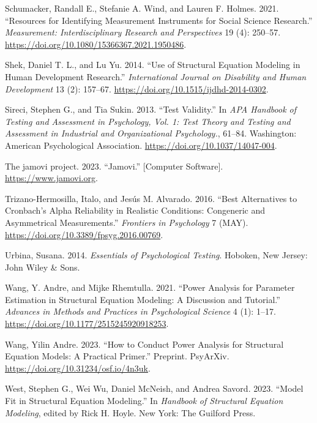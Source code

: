 \documentclass[
  a4paper,
]{article}
\newlength{\cslhangindent}
\newenvironment{CSLReferences}[2] %
 {\begin{list}{}{%
  \setlength{\itemindent}{0pt}
  \setlength{\leftmargin}{0pt}
  \setlength{\parsep}{0pt}
  \ifodd #1
   \setlength{\leftmargin}{\cslhangindent}
   \setlength{\itemindent}{-1\cslhangindent}
  \fi
  \setlength{\itemsep}{#2\baselineskip}}}
 {\end{list}}
\begin{document}
\begin{CSLReferences}{1}{0}
Schumacker, Randall E., Stefanie A. Wind, and Lauren F. Holmes. 2021.
{``Resources for {Identifying Measurement Instruments} for {Social
Science Research}.''} \emph{Measurement: Interdisciplinary Research and
Perspectives} 19 (4): 250--57.
\url{https://doi.org/10.1080/15366367.2021.1950486}.

Shek, Daniel T. L., and Lu Yu. 2014. {``Use of Structural Equation
Modeling in Human Development Research.''} \emph{International Journal
on Disability and Human Development} 13 (2): 157--67.
\url{https://doi.org/10.1515/ijdhd-2014-0302}.

Sireci, Stephen G., and Tia Sukin. 2013. {``Test Validity.''} In
\emph{{APA} Handbook of Testing and Assessment in Psychology, {Vol}. 1:
{Test} Theory and Testing and Assessment in Industrial and
Organizational Psychology.}, 61--84. Washington: American Psychological
Association. \url{https://doi.org/10.1037/14047-004}.

The jamovi project. 2023. {``Jamovi.''} {[}Computer Software{]}.
\url{https://www.jamovi.org}.

Trizano-Hermosilla, Italo, and Jesús M. Alvarado. 2016. {``Best
Alternatives to {Cronbach}'s Alpha Reliability in Realistic Conditions:
{Congeneric} and Asymmetrical Measurements.''} \emph{Frontiers in
Psychology} 7 (MAY). \url{https://doi.org/10.3389/fpsyg.2016.00769}.

Urbina, Susana. 2014. \emph{Essentials of {Psychological Testing}}.
Hoboken, New Jersey: John Wiley \& Sons.

Wang, Y. Andre, and Mijke Rhemtulla. 2021. {``Power {Analysis} for
{Parameter Estimation} in {Structural Equation Modeling}: {A Discussion}
and {Tutorial}.''} \emph{Advances in Methods and Practices in
Psychological Science} 4 (1): 1--17.
\url{https://doi.org/10.1177/2515245920918253}.

Wang, Yilin Andre. 2023. {``How to {Conduct Power Analysis} for
{Structural Equation Models}: {A Practical Primer}.''} Preprint.
PsyArXiv. \url{https://doi.org/10.31234/osf.io/4n3uk}.

West, Stephen G., Wei Wu, Daniel McNeish, and Andrea Savord. 2023.
{``Model {Fit} in {Structural Equation Modeling}.''} In \emph{Handbook
of {Structural Equation Modeling}}, edited by Rick H. Hoyle. New York:
The Guilford Press.


\end{CSLReferences}
\end{document}

